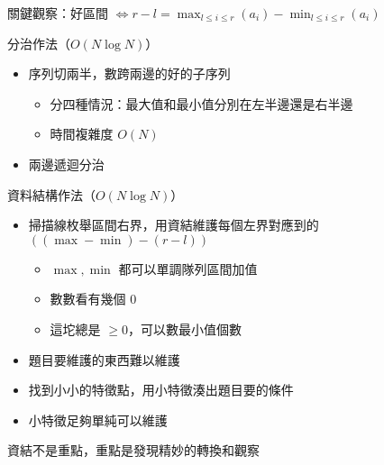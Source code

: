 \begin{frame}{}
    關鍵觀察：好區間 $\iff r - l = \max_{l \leq i \leq r}(a_i) - \min_{l \leq i \leq r}(a_i)$

     {
        分治作法（$O(N \log N)$）
    
        \begin{itemize}
            \item 序列切兩半，數跨兩邊的好的子序列
            \begin{itemize}
                \item 分四種情況：最大值和最小值分別在左半邊還是右半邊
                \item 時間複雜度 $O(N)$
            \end{itemize}
            \item 兩邊遞迴分治
        \end{itemize}
    }
     {
        資料結構作法（$O(N \log N)$）
    
        \begin{itemize}
            \item 掃描線枚舉區間右界，用資結維護每個左界對應到的 $\left(\left(\max - \min\right) - \left(r - l\right)\right)$
            \begin{itemize}
                \item $\max, \min$ 都可以單調隊列區間加值
                \item 數數看有幾個 $0$
                \item 這坨總是 $\geq 0$，可以數最小值個數
            \end{itemize}
        \end{itemize}
    }
\end{frame}

\begin{frame}{\ebtitle}
    \begin{itemize}
        \item 題目要維護的東西難以維護
        \item 找到小小的特徵點，用小特徵湊出題目要的條件
        \item 小特徵足夠單純可以維護
    \end{itemize}

    資結不是重點，重點是發現精妙的轉換和觀察
\end{frame}

